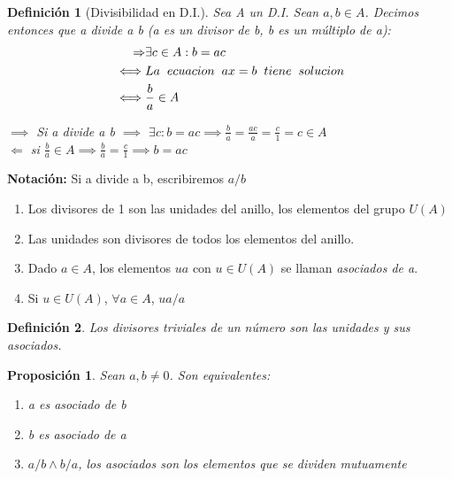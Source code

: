 \documentclass[11pt, a4paper, titlepage]{article}
\makeatletter
\renewenvironment{proof}[1][\proofname] {\vspace{-15pt}\par\pushQED{\qed}\normalfont\topsep6\p@\@plus6\p@\relax\trivlist\item[\hskip\labelsep\it#1\@addpunct{.}]\ignorespaces}{\popQED\endtrivlist\@endpefalse}
\theoremstyle{theorem-style}
\newtheorem*{nprop}{Proposición}
\theoremstyle{definition-style}
\newtheorem*{ndef}{Definición}
\theoremstyle{remark-style}
\theoremstyle{example-style}
\newenvironment{nlist}
{\begin{enumerate}
\renewcommand\labelenumi{(\emph{\roman{enumi})}}}
{\end{enumerate}}
\makeatother
\begin{document}
\begin{ndef}[Divisibilidad en D.I.]
	
Sea A un D.I. Sean $a,b\in A$. Decimos entonces que a divide a b (a es un divisor de b, b es un múltiplo de a):
\begin{align}
	\Rightarrow& \exists c \in A : b = ac 
\\
	\iff& La \hspace{0.2cm} ecuacion \hspace{0.2cm} ax=b \hspace{0.2cm} tiene\hspace{0.2cm}solucion
\\
\iff& \frac{b}{a} \in A
\end{align}

\begin{proof}
	$\boxed{\implies}$ Si a divide a b $\implies$ $\exists c: b=ac \implies \frac{b}{a} = \frac{ac}{a} = \frac{c}{1} = c \in A$\\
	$\boxed{\Longleftarrow}$ si $\frac{b}{a}\in A \implies \frac{b}{a} = \frac{c}{1} \implies b = ac$
\end{proof}
\end{ndef}
\textbf{Notación:} Si a divide a b, escribiremos $a/b$

\begin{nlist}
	\item Los divisores de 1 son las unidades del anillo, los elementos del grupo $U(A)$
	\item Las unidades son divisores de todos los elementos del anillo.
	\item Dado $a\in A$, los elementos $ua$ con $u\in U(A)$ se llaman \emph{asociados de a}.
	\item Si $u\in U(A)$, $\forall a \in A$, $ua/a$
	
\end{nlist}

\begin{ndef}
	Los divisores triviales de un número son las unidades y sus asociados.
\end{ndef}

\begin{nprop}
	Sean $a,b\neq 0$. Son equivalentes:
	\begin{nlist}
	\item a es asociado de b
	\item b es asociado de a
	\item $a/b \wedge b/a$, los asociados son los elementos que se dividen mutuamente
	
\end{nlist}
\end{nprop}
\end{document}
